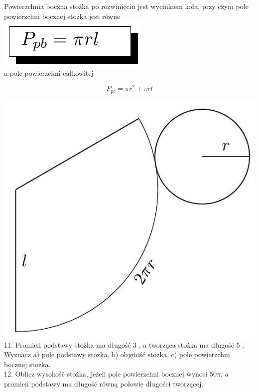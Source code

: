 \documentclass[10pt]{article}
\begin{document}
Powierzchnia boczna stożka po rozwinięciu jest wycinkiem koła, przy czym pole powierzchni bocznej stożka jest równe\\
\includegraphics[max width=\textwidth, center]{2024_11_21_e9b4faa005d5be2cc318g-097}\\
a pole powierzchni całkowitej

\[
P_{p c}=\pi r^{2}+\pi r l
\]

\includegraphics[max width=\textwidth, center]{2024_11_21_e9b4faa005d5be2cc318g-097(1)}\\
11. Promień podstawy stożka ma długość 3 , a tworząca stożka ma długość 5 . Wyznacz a) pole podstawy stożka, b) objętość stożka, c) pole powierzchni bocznej stożka.\\
12. Oblicz wysokość stożka, jeżeli pole powierzchni bocznej wynosi \(50 \pi\), a promień podstawy ma długość równą połowie długości tworzącej.
\end{document}
